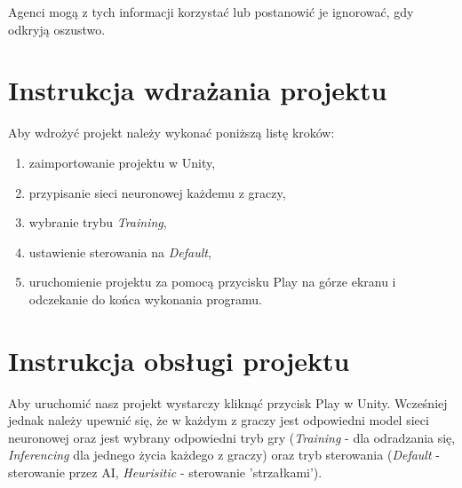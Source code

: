 \documentclass[12pt,a4paper]{article}
\begin{document}
Agenci mogą z tych informacji korzystać lub postanowić je ignorować, gdy odkryją oszustwo.



\section{Instrukcja wdrażania projektu}
	Aby wdrożyć projekt należy wykonać poniższą listę kroków:

\begin{enumerate}
	\item zaimportowanie projektu w Unity,
	\item przypisanie sieci neuronowej każdemu z graczy,
	\item wybranie trybu \textit{Training},
	\item ustawienie sterowania na \textit{Default},
	\item uruchomienie projektu za pomocą przycisku Play na górze ekranu i odczekanie do końca wykonania programu.
\end{enumerate}



\section{Instrukcja obsługi projektu}
Aby uruchomić nasz projekt wystarczy kliknąć przycisk Play w Unity. Wcześniej jednak należy upewnić się, że w każdym z graczy jest odpowiedni model sieci neuronowej oraz jest wybrany odpowiedni tryb gry (\textit{Training} - dla odradzania się, \textit{Inferencing} dla jednego życia każdego z graczy) oraz tryb sterowania (\textit{Default} - sterowanie przez AI, \textit{Heurisitic} - sterowanie 'strzałkami').
\end{document}
